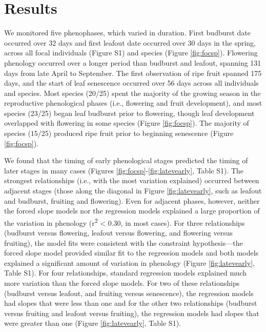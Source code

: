 \documentclass{article}
\begin{document}
\section* {Results}
\par We monitored five phenophases, which varied in duration. First budburst date occurred over 32 days and first leafout date occurred over 30 days in the spring, across all focal individuals (Figure S1) and species (Figure \ref{fig:focsp}). Flowering phenology occurred over a longer period than budburst and leafout, spanning 131 days from late April to September. The first observation of ripe fruit spanned 175 days, and the start of leaf senescence occurred over 56 days across all individuals and species. Most species (20/25) spent the majority of the growing season in the reproductive phenological phases (i.e., flowering and fruit development), and most species (23/25) began leaf budburst prior to flowering, though leaf development overlapped with flowering in some species (Figure \ref{fig:focsp}). The majority of species (15/25) produced ripe fruit prior to beginning senescence (Figure \ref{fig:focsp}).

\par We found that the timing of early phenological stages predicted the timing of later stages in many cases (Figures \ref{fig:focsp}-\ref{fig:latevearly}, Table S1). The strongest relationships (i.e., with the most variation explained) occurred between adjacent stages (those along the diagonal in Figure \ref{fig:latevearly}, such as leafout and budburst, fruiting and flowering). Even for adjacent phases, however, neither the forced slope models nor the regression models explained a large proportion of the variation in phenology (r\textsuperscript{2} < 0.30, in most cases). For three relationships (budburst versus flowering, leafout versus flowering, and flowering versus fruiting), the model fits were consistent with the constraint hypothesis---the forced slope model provided similar fit to the regression models and both models explained a significant amount of variation in phenology (Figure \ref{fig:latevearly}, Table S1). For four relationships, standard regression models explained much more variation than the forced slope models.   For two of these relationships (budburst versus leafout, and fruiting versus senescence), the regression models had slopes that were less than one and for the other two relationships (budburst versus fruiting and leafout versus fruiting), the regression models had slopes that were greater than one (Figure \ref{fig:latevearly}, Table S1).
\end{document}

